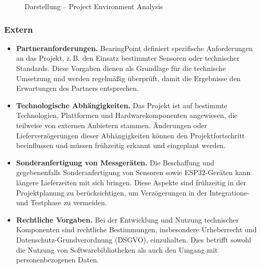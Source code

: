\documentclass{article}
\begin{document}
\begin{figure}[H]
  \centering
  
  \caption{Darstellung – Project Environment Analysis}
  \label{fig:project_environment_analysis}
\end{figure}

\pagebreak
\subsubsection*{Extern}
\begin{itemize}
  \item \textbf{Partneranforderungen.} BearingPoint definiert spezifische Anforderungen an das Projekt, z.\,B. den Einsatz bestimmter Sensoren oder technischer Standards. Diese Vorgaben dienen als Grundlage für die technische Umsetzung und werden regelmäßig überprüft, damit die Ergebnisse den Erwartungen des Partners entsprechen.
  \item \textbf{Technologische Abhängigkeiten.} Das Projekt ist auf bestimmte Technologien, Plattformen und Hardwarekomponenten angewiesen, die teilweise von externen Anbietern stammen. Änderungen oder Lieferverzögerungen dieser Abhängigkeiten können den Projektfortschritt beeinflussen und müssen frühzeitig erkannt und eingeplant werden.
  \item \textbf{Sonderanfertigung von Messgeräten.} Die Beschaffung und gegebenenfalls Sonderanfertigung von Sensoren sowie ESP32-Geräten kann längere Lieferzeiten mit sich bringen. Diese Aspekte sind frühzeitig in der Projektplanung zu berücksichtigen, um Verzögerungen in der Integrations- und Testphase zu vermeiden.
  \item \textbf{Rechtliche Vorgaben.} Bei der Entwicklung und Nutzung technischer Komponenten sind rechtliche Bestimmungen, insbesondere Urheberrecht und Datenschutz-Grundverordnung (DSGVO), einzuhalten. Dies betrifft sowohl die Nutzung von Softwarebibliotheken als auch den Umgang mit personenbezogenen Daten.
\end{itemize}
\end{document}
